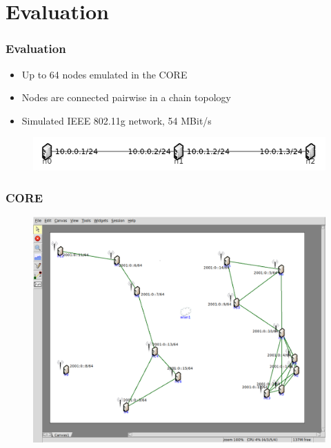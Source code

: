 \section{Evaluation}

\begin{frame}
  \frametitle{Evaluation}

  \begin{itemize}
  \item Up to 64 nodes emulated in the \acf{CORE}
  \item Nodes are connected pairwise in a chain topology
  \item Simulated IEEE 802.11g network, 54 MBit/s
  \end{itemize}

  \begin{figure}
    \includegraphics[width=0.8\linewidth,keepaspectratio]{include/chain-topology}
  \end{figure}
\end{frame}

\begin{frame}
  \frametitle{CORE}

  \begin{figure}
    \includegraphics[width=0.7\linewidth,keepaspectratio]{include/core-screenshot}
  \end{figure}
\end{frame}

